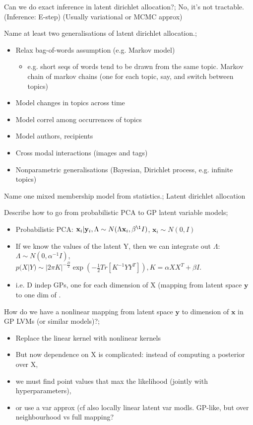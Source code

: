 \documentclass{article}
\begin{document}
Can we do exact inference in latent dirichlet allocation?; No, it's not tractable. (Inference: E-step) (Usually variational or MCMC approx)

Name at least two generalisations of latent dirichlet allocation.; \begin{itemize} \item Relax bag-of-words assumption (e.g. Markov model) \begin{itemize} \item e.g. short seqs of words tend to be drawn from the same topic. Markov chain of markov chains (one for each topic, say, and switch between topics) \end{itemize} \item Model changes in topics across time \item Model correl among occurrences of topics \item Model authors, recipients \item Cross modal interactions (images and tags) \item Nonparametric generalisations (Bayesian, Dirichlet process, e.g. infinite topics) \end{itemize}

Name one mixed membership model from statistics.; Latent dirichlet allocation


Describe how to go from probabilistic PCA to GP latent variable models; \begin{itemize} \item Probabilistic PCA: $\mathbf{x}_i|\mathbf{y}_i, \Lambda \sim N(\Lambda\mathbf{x}_i, \beta^{\1}I)$, $\mathbf{x}_i\sim N(0, I)$ \item If we know the values of the latent Y, then we can integrate out $\Lambda$: $\Lambda\sim N(0, \alpha^{-1}I)$, $p(X|Y)\sim |2\pi K|^{-\frac{D}{2}}\exp(-\frac{1}{2}Tr[K^{-1}YY^T]), K=\alpha XX^T+\beta I$. \item i.e. D indep GPs, one for each dimension of X (mapping from latent space $\mathbf{y}$ to one dim of . \end{itemize}

How do we have a nonlinear mapping from latent space $\mathbf{y}$ to dimension of $\mathbf{x}$ in GP LVMs (or similar models)?; \begin{itemize} \item Replace the linear kernel with nonlinear kernels \item But now dependence on X is complicated: instead of computing a posterior over X,  \item we must find point values that max the likelihood (jointly with hyperparameters),  \item or use a var approx (cf also locally linear latent var modls. GP-like, but over neighbourhood vs full mapping? \end{itemize}
\end{document}
